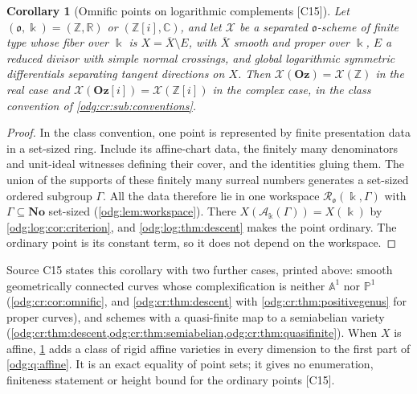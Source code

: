 \documentclass[11pt,oneside]{article}
\numberwithin{equation}{section}
\newtheorem{corollary}[corollary]{Corollary}
\theoremstyle{definition}
\theoremstyle{remark}
\newcommand{\No}{\mathbf{No}}
\newcommand{\Oz}{\mathbf{Oz}}
\newcommand{\Z}{\mathbb Z}
\newcommand{\R}{\mathbb R}
\newcommand{\C}{\mathbb C}
\newcommand{\src}[1]{\textup{\textsf{\small[#1]}}}
\newcommand{\Og}{\Oz[i]}
\newcommand{\crA}{\mathcal A_\Bbbk(\Gamma)}
\newcommand{\Aff}{\mathbb A}
\begin{document}
\begin{corollary}[Omnific points on logarithmic complements \src{C15}]\label{odg:log:cor:omnific}
Let $(\mathfrak o,\Bbbk)=(\Z,\R)$ or $(\Z[i],\C)$, and let $\mathcal X$ be a separated
$\mathfrak o$-scheme of finite type whose fiber over $\Bbbk$ is
$X=\overline X\setminus E$, with $\overline X$ smooth and proper over $\Bbbk$, $E$ a
reduced divisor with simple normal crossings, and global logarithmic symmetric
differentials separating tangent directions on $X$. Then $\mathcal X(\Oz)=\mathcal X(\Z)$
in the real case and $\mathcal X(\Og)=\mathcal X(\Z[i])$ in the complex case, in the class
convention of \cref{odg:cr:sub:conventions}.
\end{corollary}
\begin{proof}
In the class convention, one point is represented by finite presentation
data in a set-sized ring. Include its affine-chart data, the finitely many
denominators and unit-ideal witnesses defining their cover, and the
identities gluing them. The union of the supports of these finitely many
surreal numbers generates a set-sized ordered subgroup $\Gamma$.
All the data therefore lie in one workspace
$\mathcal R_{\mathfrak o}(\Bbbk,\Gamma)$ with
$\Gamma\subseteq\No$ set-sized (\cref{odg:lem:workspace}). There
$X(\crA)=X(\Bbbk)$ by \cref{odg:log:cor:criterion}, and \cref{odg:log:thm:descent} makes
the point ordinary. The ordinary point is its constant term, so it does not depend on the
workspace.
\end{proof}

Source C15 states this corollary with two further cases, printed above: smooth
geometrically connected curves whose complexification is neither $\Aff^1$ nor
$\mathbb P^1$ (\cref{odg:cr:cor:omnific}, and \cref{odg:cr:thm:descent} with
\cref{odg:cr:thm:positivegenus} for proper curves), and schemes with a quasi-finite map to
a semiabelian variety (\cref{odg:cr:thm:descent,odg:cr:thm:semiabelian,odg:cr:thm:quasifinite}).
When $X$ is affine, \cref{odg:log:cor:omnific} adds a class of rigid affine varieties in
every dimension to the first part of \cref{odg:q:affine}. It is an exact equality of point
sets; it gives no enumeration, finiteness statement or height bound for the ordinary
points \src{C15}.
\end{document}
